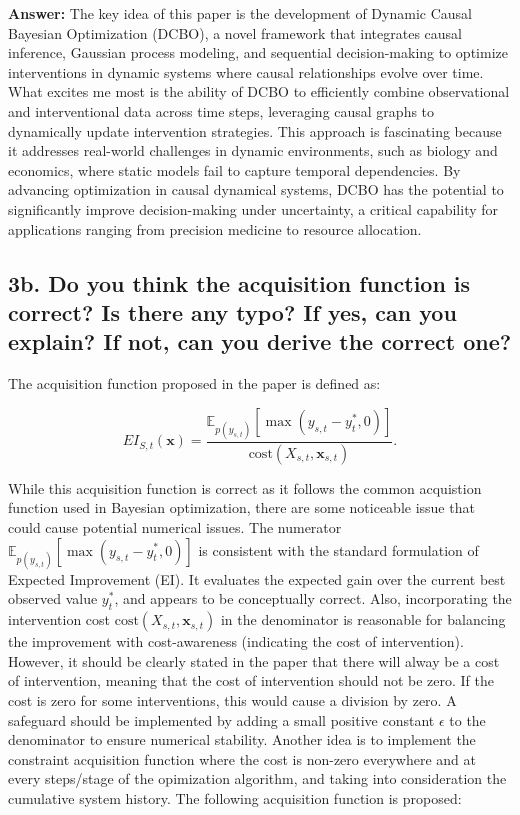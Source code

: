 \documentclass[a4paper,10pt]{article}
\begin{document}
\textbf{Answer:} The key idea of this paper is the development of Dynamic Causal Bayesian Optimization (DCBO), a novel framework that integrates causal inference, Gaussian process modeling, and sequential decision-making to optimize interventions in dynamic systems where causal relationships evolve over time. What excites me most is the ability of DCBO to efficiently combine observational and interventional data across time steps, leveraging causal graphs to dynamically update intervention strategies. This approach is fascinating because it addresses real-world challenges in dynamic environments, such as biology and economics, where static models fail to capture temporal dependencies. By advancing optimization in causal dynamical systems, DCBO has the potential to significantly improve decision-making under uncertainty, a critical capability for applications ranging from precision medicine to resource allocation.

\subsection*{3b. Do you think the acquisition function is correct?  Is there any typo? If yes, can you explain?  If not, can you derive the correct one?}

The acquisition function proposed in the paper is defined as:

\begin{equation}
EI_{S,t}(\mathbf{x}) = \frac{\mathbb{E}_{p(y_{s,t})}[\max(y_{s,t} - y^*_t, 0)]}{\text{cost}(X_{s,t}, \mathbf{x}_{s,t})}.
\end{equation}

While this acquisition function is correct as it follows the common acquistion function used in Bayesian optimization, there are some noticeable issue that could cause potential numerical issues.  The numerator 
\(\mathbb{E}_{p(y_{s,t})}[\max(y_{s,t} - y^*_t, 0)]\) is consistent with the standard formulation of Expected Improvement (EI). It evaluates the expected gain over the current best observed value \(y^*_t\), and appears to be conceptually correct. Also, incorporating the intervention cost \(\text{cost}(X_{s,t}, \mathbf{x}_{s,t})\) in the denominator is reasonable for balancing the improvement with cost-awareness (indicating the cost of intervention). However, it should be clearly stated in the paper that there will alway be a cost of intervention, meaning that the cost of intervention should not be zero. If the cost is zero for some interventions, this would cause a division by zero. A safeguard should be implemented by adding a small positive constant \(\epsilon\) to the denominator to ensure numerical stability. Another idea is to implement the constraint acquisition function where the cost is non-zero everywhere and at every steps/stage of the opimization algorithm, and taking into consideration the cumulative system history. The following acquisition function is proposed:
\end{document}
